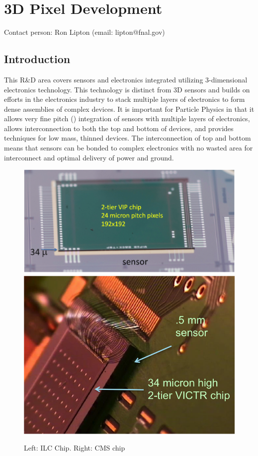 \section{3D Pixel Development}
Contact person: Ron Lipton (email: lipton@fnal.gov)
\subsection{Introduction}
This R\&D area covers sensors and electronics integrated utilizing 3-dimensional electronics technology.  This technology is distinct from 3D sensors and builds on efforts in the electronics industry to stack multiple layers of electronics to form dense assemblies of complex devices.  It is important for Particle Physics in that it allows very fine pitch (\unit[4]{\micron}) integration of sensors with multiple layers of electronics, allows interconnection to both the top and bottom of devices, and provides techniques for low mass, thinned devices. The interconnection of top and bottom means that sensors can be bonded to complex electronics with no wasted area for interconnect and optimal delivery of power and ground.

\begin{figure}[hb]
    \centering
    \includegraphics[width=.57\textwidth]{VertexDetector/VIP/ILCChip}
    \includegraphics[width=.37\textwidth]{VertexDetector/VIP/CMSChip}
    \caption{Left: ILC Chip. Right: CMS chip}
    \label{fig:VertexDetector:VIP:variants}
\end{figure}

